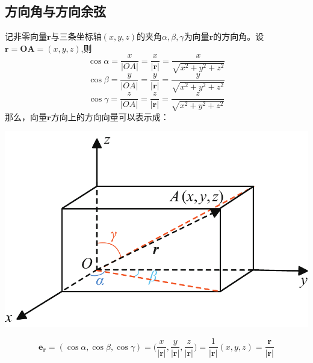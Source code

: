 \subsection{方向角与方向余弦}
\vspace*{0.5em}
\noindent
\begin{minipage}{0.6\linewidth}
\hspace*{2em}记非零向量$\boldsymbol{r}$与三条坐标轴$(x,y,z)$的夹角$\alpha,\beta,\gamma$为向量$\boldsymbol{r}$的方向角。设$\boldsymbol{r}=\boldsymbol{OA}=(x,y,z)$,则
\begin{equation}
	\cos \alpha=\frac{x}{|OA|}=\frac{x}{\boldsymbol{|r|}}=\frac{x}{\sqrt{x^2+y^2+z^2}}
\end{equation}
\begin{equation}
	\cos \beta=\frac{y}{|OA|}=\frac{y}{\boldsymbol{|r|}}=\frac{y}{\sqrt{x^2+y^2+z^2}}
\end{equation}
\begin{equation}
	\cos \gamma=\frac{z}{|OA|}=\frac{z}{\boldsymbol{|r|}}=\frac{z}{\sqrt{x^2+y^2+z^2}}
\end{equation}
那么，向量$\boldsymbol{r}$方向上的方向向量可以表示成：
\end{minipage}
\begin{minipage}{0.4\linewidth}
	\centering
	\includegraphics[width = 0.85\linewidth]{pic/C-5/vesang3}
	\vspace*{-1em}
	\label{向量的方向角}
\end{minipage}

\begin{equation}
	\boldsymbol{e_r}=(\cos \alpha,\cos \beta,\cos \gamma)=\bigg(\frac{x}{|\boldsymbol{r}|},\frac{y}{|\boldsymbol{r}|},\frac{z}{|\boldsymbol{r}|}\bigg)=\frac{1}{|\boldsymbol{r}|}(x,y,z)=\frac{\boldsymbol{r}}{|\boldsymbol{r}|}
\end{equation}
